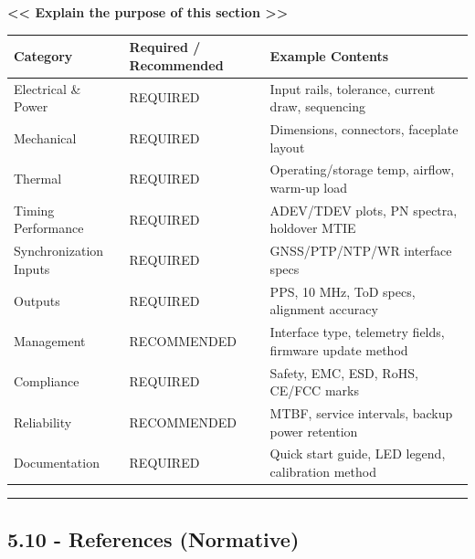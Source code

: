 \textbf{\textless\textless{} Explain the purpose of this section
\textgreater\textgreater{}}

{\def\LTcaptype{none} %
\begin{longtable}[]{@{}
  >{\raggedright\arraybackslash}p{}
  >{\raggedright\arraybackslash}p{}
  >{\raggedright\arraybackslash}p{}@{}}
\toprule\noalign{}
\begin{minipage}[b]{\linewidth}\raggedright
Category
\end{minipage} & \begin{minipage}[b]{\linewidth}\raggedright
Required / Recommended
\end{minipage} & \begin{minipage}[b]{\linewidth}\raggedright
Example Contents
\end{minipage} \\
\midrule\noalign{}
\endhead
\bottomrule\noalign{}
\endlastfoot
Electrical \& Power & REQUIRED & Input rails, tolerance, current draw,
sequencing \\
Mechanical & REQUIRED & Dimensions, connectors, faceplate layout \\
Thermal & REQUIRED & Operating/storage temp, airflow, warm-up load \\
Timing Performance & REQUIRED & ADEV/TDEV plots, PN spectra, holdover
MTIE \\
Synchronization Inputs & REQUIRED & GNSS/PTP/NTP/WR interface specs \\
Outputs & REQUIRED & PPS, 10 MHz, ToD specs, alignment accuracy \\
Management & RECOMMENDED & Interface type, telemetry fields, firmware
update method \\
Compliance & REQUIRED & Safety, EMC, ESD, RoHS, CE/FCC marks \\
Reliability & RECOMMENDED & MTBF, service intervals, backup power
retention \\
Documentation & REQUIRED & Quick start guide, LED legend, calibration
method \\
\end{longtable}
}

\begin{center}\rule{0.5\linewidth}{0.5pt}\end{center}

\subsection{5.10 - References (Normative)}\label{references-normative}

